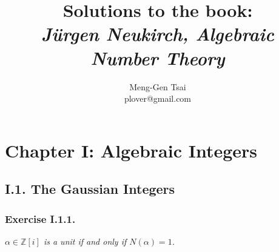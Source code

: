 \documentclass{article}
\title{\textbf{Solutions to the book: \\\emph{J\"{u}rgen Neukirch, Algebraic Number Theory}}}
\author{Meng-Gen Tsai \\ plover@gmail.com}
\begin{document}
\maketitle
\tableofcontents











\newpage
\section*{Chapter I: Algebraic Integers \\}



\subsection*{I.1. The Gaussian Integers \\}



\subsubsection*{Exercise I.1.1.}
\emph{$\alpha \in \mathbb{Z}[i]$ is a unit if and only if $N(\alpha) = 1$.} \\
\end{document}
